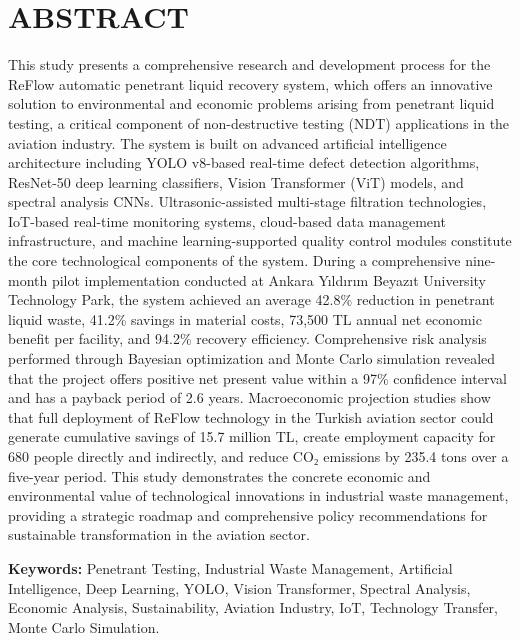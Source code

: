 \documentclass[12pt,a4paper]{article}
\begin{document}
\section*{\bfseries ABSTRACT}

This study presents a comprehensive research and development process for the ReFlow automatic penetrant liquid recovery system, which offers an innovative solution to environmental and economic problems arising from penetrant liquid testing, a critical component of non-destructive testing (NDT) applications in the aviation industry. The system is built on advanced artificial intelligence architecture including YOLO v8-based real-time defect detection algorithms, ResNet-50 deep learning classifiers, Vision Transformer (ViT) models, and spectral analysis CNNs. Ultrasonic-assisted multi-stage filtration technologies, IoT-based real-time monitoring systems, cloud-based data management infrastructure, and machine learning-supported quality control modules constitute the core technological components of the system. During a comprehensive nine-month pilot implementation conducted at Ankara Yıldırım Beyazıt University Technology Park, the system achieved an average 42.8\% reduction in penetrant liquid waste, 41.2\% savings in material costs, 73,500 TL annual net economic benefit per facility, and 94.2\% recovery efficiency. Comprehensive risk analysis performed through Bayesian optimization and Monte Carlo simulation revealed that the project offers positive net present value within a 97\% confidence interval and has a payback period of 2.6 years. Macroeconomic projection studies show that full deployment of ReFlow technology in the Turkish aviation sector could generate cumulative savings of 15.7 million TL, create employment capacity for 680 people directly and indirectly, and reduce CO₂ emissions by 235.4 tons over a five-year period. This study demonstrates the concrete economic and environmental value of technological innovations in industrial waste management, providing a strategic roadmap and comprehensive policy recommendations for sustainable transformation in the aviation sector.

\textbf{Keywords:} Penetrant Testing, Industrial Waste Management, Artificial Intelligence, Deep Learning, YOLO, Vision Transformer, Spectral Analysis, Economic Analysis, Sustainability, Aviation Industry, IoT, Technology Transfer, Monte Carlo Simulation.


\newpage
\tableofcontents
\listoffigures
\listoftables
\listofalgorithms
\newpage
\end{document}
